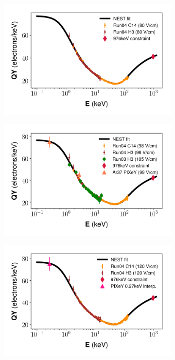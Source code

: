 \begin{figure}[h!]
\begin{subfigure}{0.5\textwidth}
  \caption{}
\end{subfigure}%
\begin{subfigure}{0.5\textwidth}
  \centering
  \includegraphics[width=\textwidth]{Figures/Yields_fit_old/NEST_fit_80Vcm_old.pdf}
  \caption{}
\end{subfigure}
\begin{subfigure}{0.5\textwidth}
  \centering
  \includegraphics[width=\textwidth]{Figures/Yields_fit_old/NEST_fit_98Vcm_old.pdf}
  \caption{}
\end{subfigure}%
\begin{subfigure}{0.5\textwidth}
  \centering
  \includegraphics[width=\textwidth]{Figures/Yields_fit_old/NEST_fit_120Vcm_old.pdf}

\end{subfigure}
\end{figure}

